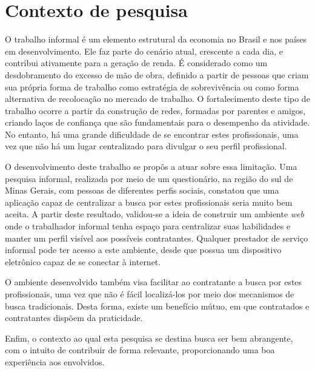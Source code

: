 \section{Contexto de pesquisa}

\par O trabalho informal é um elemento estrutural da economia no Brasil e nos países em desenvolvimento. Ele faz parte do cenário atual, crescente a cada dia, e contribui ativamente para a geração de renda. É considerado como um desdobramento do excesso de mão de obra, definido a partir de pessoas que criam sua própria forma de trabalho como estratégia de sobrevivência ou como forma alternativa de recolocação no mercado de trabalho. O fortalecimento deste tipo de trabalho ocorre a partir da construção de redes, formadas por parentes e amigos, criando laços de confiança que são fundamentais para o desempenho da atividade. No entanto, há uma grande dificuldade de se encontrar estes profissionais, uma vez que não há um lugar centralizado para divulgar o seu perfil profissional.

\par O desenvolvimento deste trabalho se propôs a atuar sobre essa limitação. Uma pesquisa informal, realizada por meio de um questionário, na região do sul de Minas Gerais, com pessoas de diferentes perfis sociais, constatou que uma aplicação capaz de centralizar a busca por estes profissionais seria muito bem aceita. A partir deste resultado, validou-se a ideia de construir um ambiente \textit{web} onde o trabalhador informal tenha espaço para centralizar suas habilidades e manter um perfil visível aos possíveis contratantes. Qualquer prestador de serviço informal pode ter acesso a este ambiente, desde que possua um dispositivo eletrônico capaz de se conectar à internet. 

\par O ambiente desenvolvido também visa facilitar ao contratante a busca por estes profissionais, uma vez que não é fácil localizá-los por meio dos mecanismos de busca tradicionais. Desta forma, existe um benefício mútuo, em que contratados e contratantes dispõem da praticidade.

\par Enfim, o contexto ao qual esta pesquisa se destina busca ser bem abrangente, com o intuito de contribuir de forma relevante, proporcionando uma boa experiência aos envolvidos.
 

